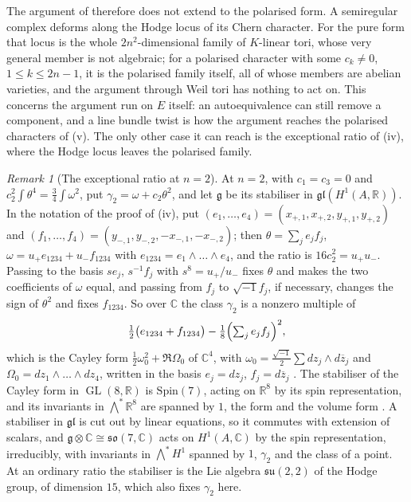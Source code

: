\documentclass[11pt,reqno]{amsart}
\theoremstyle{plain}
\theoremstyle{definition}
\theoremstyle{remark}
\newtheorem{remark}[theorem]{Remark}
\newcommand{\RR}{\mathbb{R}}
\newcommand{\CC}{\mathbb{C}}
\DeclareMathOperator{\GL}{GL}
\newcommand{\bbar}[1]{\overline{#1}}
\begin{document}
The argument of  therefore does not extend to the
polarised form. A semiregular complex deforms along the Hodge locus of its
Chern character. For the pure form that locus is the whole
$2n^{2}$-dimensional family of $K$-linear tori, whose very general member is
not algebraic; for a polarised character with some $c_{k}\ne0$,
$1\le k\le2n-1$, it is the polarised family itself, all of whose members are
abelian varieties, and the argument through Weil tori has nothing to act on.
This concerns the argument run on $E$ itself: an autoequivalence can still
remove a component, and a line bundle twist is how the argument reaches the
polarised characters of (v). The only other case it
can reach is the exceptional ratio of (iv), where the Hodge locus leaves the
polarised family.

\begin{remark}[The exceptional ratio at $n=2$]\label{rem:p2primeexceptional}
At $n=2$, with $c_{1}=c_{3}=0$ and $c_{2}^{2}\int\theta^{4}=\frac34\int\omega^{2}$,
put $\gamma_{2}=\omega+c_{2}\theta^{2}$, and let $\mathfrak{g}$ be its
stabiliser in $\mathfrak{gl}(H^{1}(A,\RR))$. In the notation of the proof of
(iv), put $(e_{1},\dots,e_{4})=(x_{+,1},x_{+,2},
y_{+,1},y_{+,2})$ and $(f_{1},\dots,f_{4})=(y_{-,1},y_{-,2},-x_{-,1},
-x_{-,2})$; then $\theta=\sum_{j}e_{j}f_{j}$,
$\omega=u_{+}e_{1234}+u_{-}f_{1234}$ with $e_{1234}=e_{1}\wedge\dots\wedge
e_{4}$, and the ratio is $16c_{2}^{2}=u_{+}u_{-}$. Passing to the basis
$se_{j}$, $s^{-1}f_{j}$ with $s^{8}=u_{+}/u_{-}$ fixes $\theta$ and makes the
two coefficients of $\omega$ equal, and passing from $f_{j}$ to
$\sqrt{-1}f_{j}$, if necessary, changes the sign of $\theta^{2}$ and fixes
$f_{1234}$. So over
$\CC$ the class $\gamma_{2}$ is a nonzero multiple of
\[
  \tfrac12\bigl(e_{1234}+f_{1234}\bigr)-\tfrac18\Bigl(\textstyle\sum_{j}e_{j}f_{j}\Bigr)^{2},
\]
which is the Cayley form $\frac12\omega_{0}^{2}+\Re\Omega_{0}$ of $\CC^{4}$,
with $\omega_{0}=\frac{\sqrt{-1}}{2}\sum dz_{j}\wedge d\bbar z_{j}$ and
$\Omega_{0}=dz_{1}\wedge\dots\wedge dz_{4}$, written in the basis
$e_{j}=dz_{j}$, $f_{j}=d\bbar z_{j}$ \cite{HL82}. The stabiliser
of the Cayley form in $\GL(8,\RR)$ is $\mathrm{Spin}(7)$, acting on $\RR^{8}$
by its spin representation, and its invariants in $\bigwedge^{*}\RR^{8}$ are
spanned by $1$, the form and the volume form \cite{Bry87}. A stabiliser in
$\mathfrak{gl}$ is cut out by linear equations, so it commutes with
extension of scalars, and $\mathfrak{g}\otimes\CC\cong\mathfrak{so}(7,\CC)$
acts on $H^{1}(A,\CC)$ by the spin representation, irreducibly, with
invariants in $\bigwedge^{*}H^{1}$ spanned by $1$, $\gamma_{2}$ and the
class of a point. At an ordinary ratio the stabiliser is the Lie algebra
$\mathfrak{su}(2,2)$ of the Hodge group, of dimension $15$, which also fixes
$\gamma_{2}$ here.


\end{remark}
\end{document}
